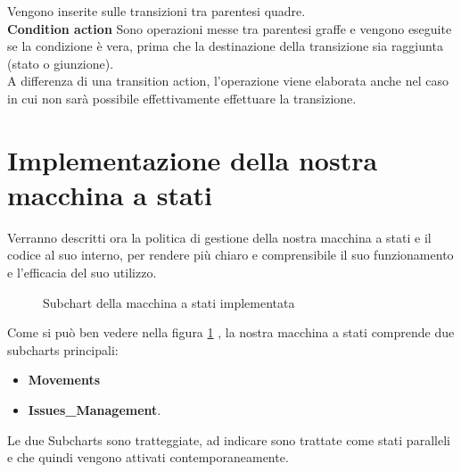 \documentclass{article}
\begin{document}
                Vengono inserite sulle transizioni tra parentesi quadre.\\

                \textbf{Condition action}
                Sono operazioni messe tra parentesi graffe e vengono eseguite se la condizione è vera,
                prima che la destinazione della transizione sia raggiunta (stato o giunzione). \\
                A differenza di una transition action, l’operazione viene elaborata anche nel caso in cui non sarà possibile effettivamente effettuare
                la transizione.\\

    \newpage
    \section{Implementazione della nostra macchina a stati}
        Verranno descritti ora la politica di gestione della nostra macchina a stati e il codice al suo interno, per rendere più chiaro e comprensibile il suo funzionamento e
        l'efficacia del suo utilizzo.

        \begin{figure} [ht]
            \caption{Subchart della macchina a stati implementata}
                \label{fig:macchina}
        \end{figure}
            
        Come si può ben vedere nella figura \ref{fig:macchina} , la nostra macchina a stati comprende due subcharts principali: 
        \begin{itemize}
            \item \textbf{Movements}
            \item \textbf{Issues\_Management}.
        \end{itemize}
        
        Le due Subcharts sono tratteggiate, ad indicare sono trattate come stati paralleli e che quindi vengono attivati contemporaneamente. 
\end{document}
